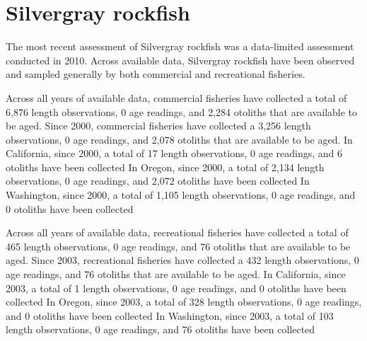 \documentclass[11pt,
  english,
  letterpaper,
]{article}
\begin{document}

\hypertarget{silvergray-rockfish}{%
\section{Silvergray rockfish}\label{silvergray-rockfish}}

\leavevmode\tagmcend\tagstructend


The most recent assessment of Silvergray rockfish was a data-limited assessment conducted in 2010. Across available data, Silvergray rockfish have been observed and sampled generally by both commercial and recreational fisheries.

\leavevmode\tagmcend\tagstructend\par


Across all years of available data, commercial fisheries have collected a total of 6,876 length observations, 0 age readings, and 2,284 otoliths that are available to be aged. Since 2000, commercial fisheries have collected a 3,256 length observations, 0 age readings, and 2,078 otoliths that are available to be aged. In California, since 2000, a total of 17 length observations, 0 age readings, and 6 otoliths have been collected In Oregon, since 2000, a total of 2,134 length observations, 0 age readings, and 2,072 otoliths have been collected In Washington, since 2000, a total of 1,105 length observations, 0 age readings, and 0 otoliths have been collected

\leavevmode\tagmcend\tagstructend\par


Across all years of available data, recreational fisheries have collected a total of 465 length observations, 0 age readings, and 76 otoliths that are available to be aged. Since 2003, recreational fisheries have collected a 432 length observations, 0 age readings, and 76 otoliths that are available to be aged. In California, since 2003, a total of 1 length observations, 0 age readings, and 0 otoliths have been collected In Oregon, since 2003, a total of 328 length observations, 0 age readings, and 0 otoliths have been collected In Washington, since 2003, a total of 103 length observations, 0 age readings, and 76 otoliths have been collected
\end{document}
